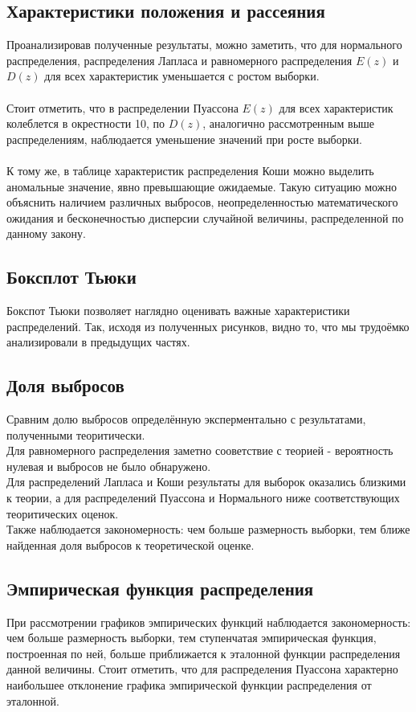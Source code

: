 \documentclass[a4paper,14pt]{article}
\begin{document}
	\subsection{Характеристики положения и рассеяния}
	Проанализировав полученные результаты, можно заметить, что для нормального распределения, распределения Лапласа и равномерного распределения $E(z)$ и $D(z)$ для всех характеристик уменьшается с ростом выборки.
	~\\
	~\\
	Стоит отметить, что в распределении Пуассона $E(z)$ для всех характеристик колеблется  в окрестности 10, по $D(z)$, аналогично рассмотренным выше распределениям, наблюдается уменьшение значений при росте выборки.
	~\\
	~\\
	К тому же, в таблице характеристик распределения Коши можно выделить аномальные значение, явно превышающие ожидаемые. Такую ситуацию можно объяснить наличием различных выбросов, неопределенностью математического ожидания и бесконечностью дисперсии случайной величины, распределенной по данному закону.
	
	\subsection{Боксплот Тьюки}
	
	Бокспот Тьюки позволяет наглядно оценивать важные характеристики распределений. Так, исходя из полученных рисунков, видно то, что мы трудоёмко анализировали в предыдущих частях.
	
	\subsection{Доля выбросов}
	Сравним долю выбросов определённую эксперментально с результатами, полученными теоритически.\\
	Для равномерного распределения заметно сооветствие с теорией - вероятность нулевая и выбросов не было обнаружено.\\
	Для распределений Лапласа и Коши результаты для выборок оказались близкими к теории, а для распределений Пуассона и Нормального ниже соответствующих теоритических оценок.\\
	Также наблюдается закономерность: чем больше размерность выборки, тем ближе найденная доля выбросов к теоретической оценке.
	
	\subsection{Эмпирическая функция распределения}
	При рассмотрении графиков эмпирических функций наблюдается закономерность: чем больше размерность выборки, тем ступенчатая эмпирическая функция, построенная по ней, больше приближается к эталонной функции распределения данной величины. Стоит отметить, что для распределения Пуассона характерно наибольшее отклонение графика эмпирической функции распределения от эталонной.
\end{document}
